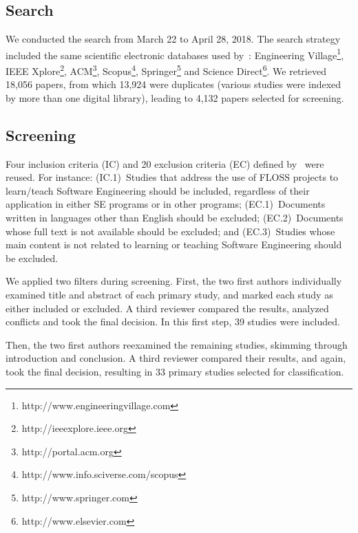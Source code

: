 \subsection{Search}
We conducted the search from March 22 to April 28, 2018. 
The search strategy included 
the same scientific electronic databases
used by~\citet{2015:CSE:nascimento}:
Engineering Village\footnote{http://www.engineeringvillage.com},
IEEE Xplore\footnote{http://ieeexplore.ieee.org}, 
ACM\footnote{http://portal.acm.org}, 
Scopus\footnote{http://www.info.sciverse.com/scopus}, 
Springer\footnote{http://www.springer.com} and 
Science Direct\footnote{http://www.elsevier.com}.
We retrieved 18,056 papers, 
from which 13,924 were duplicates 
(various studies were indexed by more than one digital library), 
leading to 4,132 papers selected for screening.

\subsection{Screening}
Four inclusion criteria (IC) and 20 exclusion criteria (EC) 
defined by~\citet{2015:CSE:nascimento} were reused. 
For instance: 
(IC.1)~Studies that address the use of FLOSS projects to learn/teach Software Engineering should be included, regardless of their application in either SE programs or in other programs;
(EC.1)~Documents written in languages other than English should be excluded; (EC.2)~Documents whose full text is not available should be excluded; and (EC.3)~Studies whose main content is not related to learning or teaching Software Engineering should be excluded.

We applied two filters during screening.
First, the two first authors individually examined title and abstract
of each primary study, and marked
each study as either included or excluded. 
A third reviewer compared the results,  
analyzed conflicts and took the final decision. 
In this first step, 39 studies were included.

Then, the two first authors reexamined 
the remaining studies, 
skimming through introduction and conclusion. 
A third reviewer compared their results, 
and again, took the final decision, 
resulting in 33 primary studies selected 
for classification.


